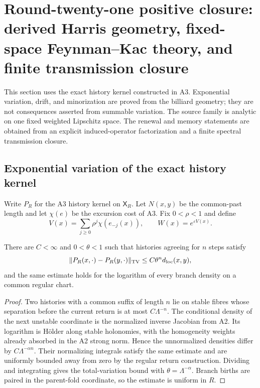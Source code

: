 \section{Round-twenty-one positive closure: derived Harris geometry, fixed-space Feynman--Kac theory, and finite transmission closure}
\label{sec:r21-a4}

This section uses the exact history kernel constructed in A3.  Exponential
variation, drift, and minorization are proved from the billiard geometry; they
are not consequences asserted from summable variation.  The source family is
analytic on one fixed weighted Lipschitz space.  The renewal and memory
statements are obtained from an explicit induced-operator factorization and a
finite spectral transmission closure.

\subsection{Exponential variation of the exact history kernel}

Write $P_R$ for the A3 history kernel on $\mathsf X_R$.  Let
$N(x,y)$ be the common-past length and let $\chi(e)$ be the excursion cost of
A3.  Fix $0<\rho<1$ and define
\[
 V(x)=\sum_{j\ge0}\rho^j\chi(e_{-j}(x)),
 \qquad W(x)=e^{\varepsilon V(x)}.
\]

\begin{lemma}
\label{lem:r21-a4-variation}
There are $C<\infty$ and $0<\theta<1$ such that histories agreeing for $n$
steps satisfy
\[
 \|P_R(x,\cdot)-P_R(y,\cdot)\|_{\rm TV}
 \le C\theta^n d_{\rm loc}(x,y),
\]
and the same estimate holds for the logarithm of every branch density on a
common regular chart.
\end{lemma}

\begin{proof}
Two histories with a common suffix of length $n$ lie on stable fibres whose
separation before the current return is at most $C\Lambda^{-n}$.  The
conditional density of the next unstable coordinate is the normalized
inverse Jacobian from A2.  Its logarithm is H\"older along stable holonomies,
with the homogeneity weights already absorbed in the A2 strong norm.  Hence
the unnormalized densities differ by $C\Lambda^{-\alpha n}$.  Their
normalizing integrals satisfy the same estimate and are uniformly bounded
away from zero by the regular return construction.  Dividing and integrating
gives the total-variation bound with
$\theta=\Lambda^{-\alpha}$.  Branch births are paired in the parent-fold
coordinate, so the estimate is uniform in $R$.
\end{proof}

